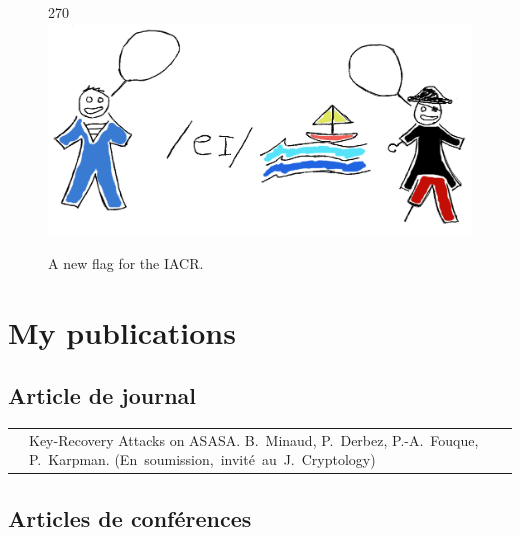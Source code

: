 \begin{figure}[!htb]
\begin{center}
\begin{turn}{270}
\includegraphics[scale=0.8]{iacr_coloured.png}
\end{turn}
\end{center}
\caption{A new flag for the IACR.\label{fig:iacr_flag}}
\end{figure}


\newcommand{\mybibtitle}[1]{\textsf{#1.}\hfil}
\newcommand{\mybibauth}[1]{#1.}
\newcommand{\mybibconf}[1]{\hspace*{\stretch{1}}\mbox{(#1)}}

\setcounter{section}{0}
\renewcommand\thesection{\Alph{section}}
\section[Mes publications]{My publications}

\subsection{Article de journal}

\noindent
\begin{tabularx}{\linewidth}{zX}
  \cite{asasajour} &
  \mybibtitle{Key-Recovery Attacks on ASASA}
  \mybibauth{B.~Minaud, P.~Derbez, P.-A.~Fouque, P.~Karpman}
  \mybibconf{En soumission, invité au J. Cryptology} \\
\end{tabularx}

\subsection{Articles de conférences}

